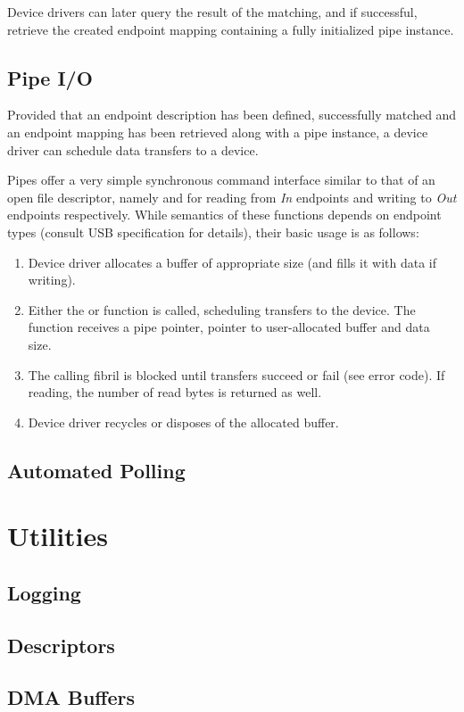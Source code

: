 Device drivers can later query the result of the matching, and if successful,
retrieve the created endpoint mapping containing a fully initialized pipe
instance.


\subsection{Pipe I/O}

Provided that an endpoint description has been defined, successfully matched
and an endpoint mapping has been retrieved along with a pipe instance, a device
driver can schedule data transfers to a device.

Pipes offer a very simple synchronous command interface similar to that of an
open file descriptor, namely  and  for
reading from \textit{In} endpoints and writing to \textit{Out} endpoints
respectively. While semantics of these functions depends on endpoint types
(consult USB specification for details), their basic usage is as follows:
~
\begin{enumerate}
	\item Device driver allocates a buffer of appropriate size (and fills it
		with data if writing).
	\item Either the  or  function is
		called, scheduling transfers to the device. The function receives a pipe
		pointer, pointer to user-allocated buffer and data size.
	\item The calling fibril is blocked until transfers succeed or fail (see
		error code). If reading, the number of read bytes is returned as well.
	\item Device driver recycles or disposes of the allocated buffer.
\end{enumerate}


\subsection{Automated Polling}


\section{Utilities}

\subsection{Logging}

\subsection{Descriptors}

\subsection{DMA Buffers}


